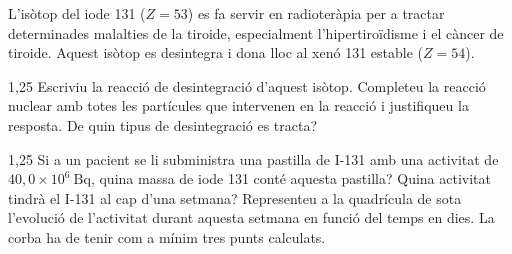 L'isòtop del iode 131 ($Z = 53$) es fa servir en radioteràpia per a tractar determinades malalties de la tiroide, especialment l'hipertiroïdisme i el càncer de tiroide. Aquest isòtop es desintegra i dona lloc al xenó 131 estable ($Z = 54$).

\begin{apartat}{1,25}
Escriviu la reacció de desintegració d'aquest isòtop. Completeu la reacció nuclear amb totes les partícules que intervenen en la reacció i justifiqueu la resposta. De quin tipus de desintegració es tracta?
\end{apartat}

\begin{apartat}{1,25}
Si a un pacient se li subministra una pastilla de I-131 amb una activitat de $40,0\times 10^{6}\ \mathrm{Bq}$, quina massa de iode 131 conté aquesta pastilla? Quina activitat tindrà el I-131 al cap d'una setmana? Representeu a la quadrícula de sota l'evolució de l'activitat durant aquesta setmana en funció del temps en dies. La corba ha de tenir com a mínim tres punts calculats.
\end{apartat}


